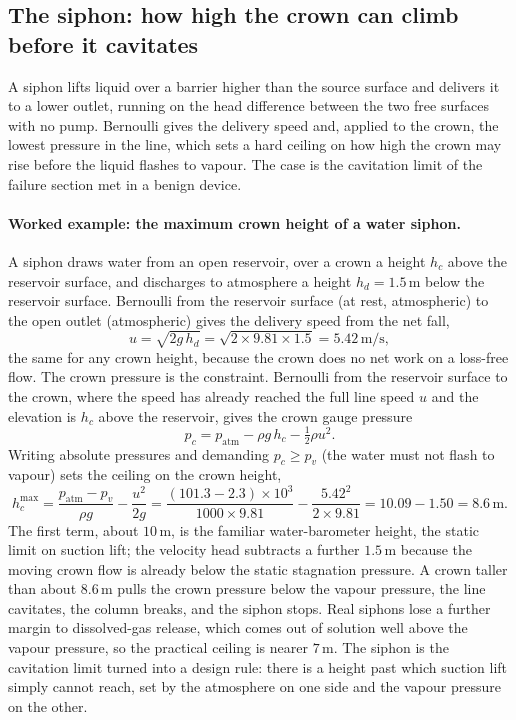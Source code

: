 \subsection{The siphon: how high the crown can climb before it cavitates}

A siphon lifts liquid over a barrier higher than the source surface and
delivers it to a lower outlet, running on the head difference between
the two free surfaces with no pump. Bernoulli gives the delivery speed
and, applied to the crown, the lowest pressure in the line, which sets a
hard ceiling on how high the crown may rise before the liquid flashes to
vapour. The case is the cavitation limit of the failure section met in a
benign device.

\paragraph{Worked example: the maximum crown height of a water siphon.}
A siphon draws water from an open reservoir, over a crown a height $h_c$
above the reservoir surface, and discharges to atmosphere a height
$h_d = 1.5\,\si{\meter}$ below the reservoir surface. Bernoulli from the
reservoir surface (at rest, atmospheric) to the open outlet (atmospheric)
gives the delivery speed from the net fall,
\[
u = \sqrt{2 g\,h_d} = \sqrt{2\times 9.81\times 1.5}
= 5.42\,\si{\meter\per\second},
\]
the same for any crown height, because the crown does no net work on a
loss-free flow. The crown pressure is the constraint. Bernoulli from the
reservoir surface to the crown, where the speed has already reached the
full line speed $u$ and the elevation is $h_c$ above the reservoir, gives
the crown gauge pressure
\[
p_c = p_\text{atm} - \rho g\,h_c - \tfrac12\rho u^2.
\]
Writing absolute pressures and demanding $p_c \ge p_v$ (the water must
not flash to vapour) sets the ceiling on the crown height,
\[
h_c^{\max} = \frac{p_\text{atm} - p_v}{\rho g} - \frac{u^2}{2g}
= \frac{(101.3 - 2.3)\times 10^3}{1000\times 9.81}
- \frac{5.42^2}{2\times 9.81}
= 10.09 - 1.50 = 8.6\,\si{\meter}.
\]
The first term, about $10\,\si{\meter}$, is the familiar
water-barometer height, the static limit on suction lift; the velocity
head subtracts a further $1.5\,\si{\meter}$ because the moving crown
flow is already below the static stagnation pressure. A crown taller
than about $8.6\,\si{\meter}$ pulls the crown pressure below the vapour
pressure, the line cavitates, the column breaks, and the siphon stops.
Real siphons lose a further margin to dissolved-gas release, which comes
out of solution well above the vapour pressure, so the practical ceiling
is nearer $7\,\si{\meter}$. The siphon is the cavitation limit turned
into a design rule: there is a height past which suction lift simply
cannot reach, set by the atmosphere on one side and the vapour pressure
on the other.

